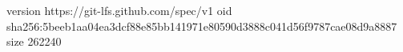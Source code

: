 version https://git-lfs.github.com/spec/v1
oid sha256:5beeb1aa04ea3dcf88e85bb141971e80590d3888c041d56f9787cae08d9a8887
size 262240
